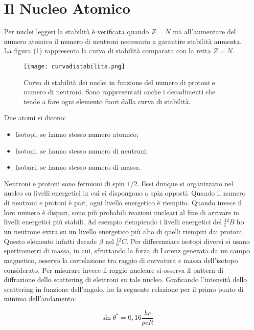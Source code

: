 \documentclass [a4paper, twoside] {book}
\begin{document}
\section{Il Nucleo Atomico}

Per nuclei leggeri la stabilità è verificata quando $Z=N$ ma all'aumentare del numero atomico il numero di neutroni necessario a garantire stabilità aumenta. 
La figura (\ref{curvadistabilita}) rappresenta la curva di stabilità comparata con la retta $Z=N$.\\
\begin{figure} []
\centering
		\texttt{[image: curvadistabilita.png]}
		\caption{Curva di stabilità dei nuclei in funzione del numero di protoni e numero di neutroni. Sono rappresentati anche i decadimenti che tende a fare ogni elemento fuori dalla curva di stabilità.}
         \label{curvadistabilita}
\end{figure}

Due atomi si dicono:

\begin{itemize}
\item Isotopi, se hanno stesso numero atomico;
\item Isotoni, se hanno stesso numero di neutroni;
\item Isobari, se hanno stesso numero di massa.
\end{itemize}

Neutroni e protoni sono fermioni di spin $1/2$. Essi dunque si organizzano nel nucleo su livelli energetici in cui si dispongono a spin opposti.
Quando il numero di neutroni e protoni è pari, ogni livello energetico è riempito. Quando invece il loro numero è dispari, sono più probabili reazioni nucleari al fine di arrivare in livelli energetici più stabili. Ad esempio riempiendo i livelli energetici del $^{12}_5B$ ho un neutrone extra su un livello energetico più alto di quelli riempiti dai protoni. Questo elemento infatti decade $\beta$ nel $^{12}_6C$.
Per differenziare isotopi diversi si usano spettrometri di massa, in cui, sfruttando la forza di Lorenz generata da un campo magnetico, osservo la correlazione tra raggio di curvatura e massa dell'isotopo considerato.
Per misurare invece il raggio nucleare si osserva il pattern di diffrazione dello scattering di elettroni su tale nucleo. Graficando l'intensità dello scattering in funzione dell'angolo, ho la seguente relazione per il primo punto di minimo dell'andamento:

\begin{equation}
\sin \theta^*=0,16\frac{hc}{pcR}
\end{equation}
\end{document}
